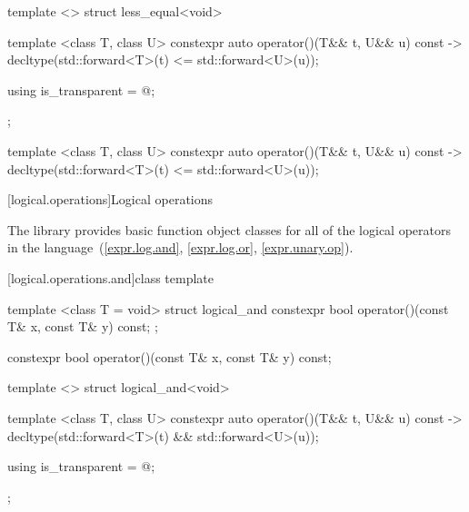 \begin{itemdescr}
\pnum\returns {}
\end{itemdescr}

%
\begin{itemdecl}
template <> struct less_equal<void> {
  template <class T, class U> constexpr auto operator()(T&& t, U&& u) const
    -> decltype(std::forward<T>(t) <= std::forward<U>(u));

  using is_transparent = @\unspec@;
};
\end{itemdecl}

%
\begin{itemdecl}
template <class T, class U> constexpr auto operator()(T&& t, U&& u) const
    -> decltype(std::forward<T>(t) <= std::forward<U>(u));
\end{itemdecl}

\begin{itemdescr}
\pnum\returns {}
\end{itemdescr}


[logical.operations]{Logical operations}

\pnum
The library provides basic function object classes for all of the logical
operators in the language~(\ref{expr.log.and}, \ref{expr.log.or}, \ref{expr.unary.op}).

[logical.operations.and]{class template }

%
\begin{itemdecl}
template <class T = void> struct logical_and {
  constexpr bool operator()(const T& x, const T& y) const;
};
\end{itemdecl}

%
\begin{itemdecl}
constexpr bool operator()(const T& x, const T& y) const;
\end{itemdecl}

\begin{itemdescr}
\pnum\returns {}
\end{itemdescr}

%
\begin{itemdecl}
template <> struct logical_and<void> {
  template <class T, class U> constexpr auto operator()(T&& t, U&& u) const
    -> decltype(std::forward<T>(t) && std::forward<U>(u));

  using is_transparent = @\unspec@;
};
\end{itemdecl}

